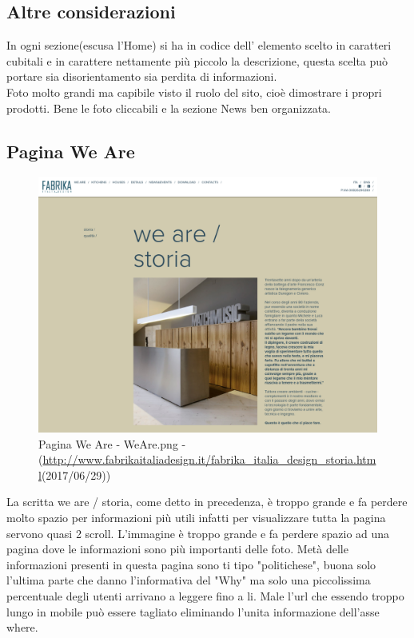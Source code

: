 \documentclass[../Relazione.tex]{subfiles}
\begin{document}
        \subsection{ Altre considerazioni}
        In ogni sezione(escusa l'Home) si ha in codice dell' elemento scelto in caratteri cubitali e in carattere nettamente più piccolo la descrizione, questa scelta può portare sia disorientamento sia perdita di informazioni.
       \\
       Foto molto grandi ma capibile visto il ruolo del sito, cioè dimostrare i propri prodotti. Bene le foto cliccabili e la sezione News ben organizzata.
      
\newpage
    \subsection{Pagina We Are}
        \begin{figure}[H]
            \centering
            \includegraphics[width=\textwidth]{img/WeAre.png}
            \caption{Pagina We Are - WeAre.png - (\url{http://www.fabrikaitaliadesign.it/fabrika_italia_design_storia.html}(2017/06/29))}
        \end{figure}
       La scritta we are / storia, come detto in precedenza, è troppo grande e fa perdere molto spazio per informazioni più utili infatti per visualizzare tutta la pagina servono quasi 2 scroll.
       L'immagine è troppo grande e fa perdere spazio ad una pagina dove le informazioni sono più importanti delle foto. Metà delle informazioni presenti in questa pagina sono ti tipo "politichese", buona solo l'ultima parte che danno l'informativa del "Why" ma solo una piccolissima percentuale degli utenti arrivano a leggere fino a li.
      Male l'url che essendo troppo lungo in mobile può essere tagliato eliminando l'unita informazione dell'asse where.
\end{document}
